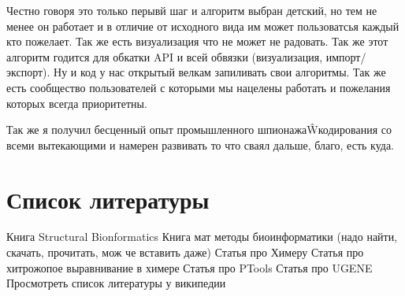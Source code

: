 \documentclass[a4paper, 12pt, titlepage, utf8]{extarticle}
\let\oldsection\section         %
\renewcommand{\section}{\newpage\oldsection}
\begin{document}
Честно говоря это только перывй шаг и алгоритм выбран детский, но тем не менее он работает и в отличие от исходного вида им может пользоватсья каждый кто пожелает. Так же есть визуализация что не может не радовать. Так же этот алгоритм годится для обкатки API и всей обвязки (визуализация, импорт/экспорт). Ну и код у нас открытый велкам запиливать свои алгоритмы. Так же есть сообщество пользователей с которыми мы нацелены работать и пожелания которых всегда приоритетны. 

Так же я получил бесценный опыт промышленного шпионажа\^Wкодирования со всеми вытекающими и намерен развивать то что сваял дальше, благо, есть куда.

\section{Список литературы}

Книга Structural Bionformatics
Книга мат методы биоинформатики (надо найти, скачать, прочитать, мож че вставить даже)
Статья про Химеру
Статья про хитрожопое выравнивание в химере
Статья про PTools
Статья про UGENE
Просмотреть список литературы у википедии
\end{document}
